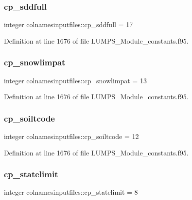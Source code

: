 \subsubsection{\texorpdfstring{cp\+\_\+sddfull}{cp\_sddfull}}
{\footnotesize\ttfamily integer colnamesinputfiles\+::cp\+\_\+sddfull = 17}



Definition at line 1676 of file L\+U\+M\+P\+S\+\_\+\+Module\+\_\+constants.\+f95.

\mbox{\label{namespacecolnamesinputfiles_a6ddb8f287fb7a2cb41191c76325b5753}} 
\subsubsection{\texorpdfstring{cp\+\_\+snowlimpat}{cp\_snowlimpat}}
{\footnotesize\ttfamily integer colnamesinputfiles\+::cp\+\_\+snowlimpat = 13}



Definition at line 1676 of file L\+U\+M\+P\+S\+\_\+\+Module\+\_\+constants.\+f95.

\mbox{\label{namespacecolnamesinputfiles_adb82da2e8ebded2ece6d2004655f1ecb}} 
\subsubsection{\texorpdfstring{cp\+\_\+soiltcode}{cp\_soiltcode}}
{\footnotesize\ttfamily integer colnamesinputfiles\+::cp\+\_\+soiltcode = 12}



Definition at line 1676 of file L\+U\+M\+P\+S\+\_\+\+Module\+\_\+constants.\+f95.

\mbox{\label{namespacecolnamesinputfiles_a06581c0ce3961889b7b9f77b1a490c5d}} 
\subsubsection{\texorpdfstring{cp\+\_\+statelimit}{cp\_statelimit}}
{\footnotesize\ttfamily integer colnamesinputfiles\+::cp\+\_\+statelimit = 8}




